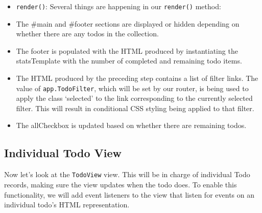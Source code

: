 \documentclass[9pt]{book}
\begin{document}
\begin{itemize}
\itemsep1pt\parskip0pt
\item
  \texttt{render()}: Several things are happening in our
  \texttt{render()} method:
\item
  The \#main and \#footer sections are displayed or hidden depending on
  whether there are any todos in the collection.
\item
  The footer is populated with the HTML produced by instantiating the
  statsTemplate with the number of completed and remaining todo items.
\item
  The HTML produced by the preceding step contains a list of filter
  links. The value of \texttt{app.TodoFilter}, which will be set by our
  router, is being used to apply the class `selected' to the link
  corresponding to the currently selected filter. This will result in
  conditional CSS styling being applied to that filter.
\item
  The allCheckbox is updated based on whether there are remaining todos.
\end{itemize}

\subsection{Individual Todo View}\label{individual-todo-view}

Now let's look at the \texttt{TodoView} view. This will be in charge of
individual Todo records, making sure the view updates when the todo
does. To enable this functionality, we will add event listeners to the
view that listen for events on an individual todo's HTML representation.
\end{document}
